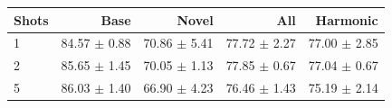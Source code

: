 \begin{tabular}{lrrrr}
\toprule
Shots & Base & Novel & All & Harmonic \\
\midrule
1 & 84.57 $\pm$ 0.88 & 70.86 $\pm$ 5.41 & 77.72 $\pm$ 2.27 & 77.00 $\pm$ 2.85 \\
2 & 85.65 $\pm$ 1.45 & 70.05 $\pm$ 1.13 & 77.85 $\pm$ 0.67 & 77.04 $\pm$ 0.67 \\
5 & 86.03 $\pm$ 1.40 & 66.90 $\pm$ 4.23 & 76.46 $\pm$ 1.43 & 75.19 $\pm$ 2.14 \\
\bottomrule
\end{tabular}